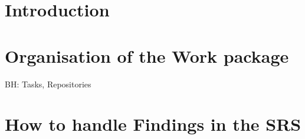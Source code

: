 \documentclass{template/openetcs_article}
\begin{document}
\section{Introduction}







\section{Organisation of the Work package}

BH: Tasks, Repositories





%

\section{How to handle Findings in the SRS}


\nocite{*}
\end{document}
